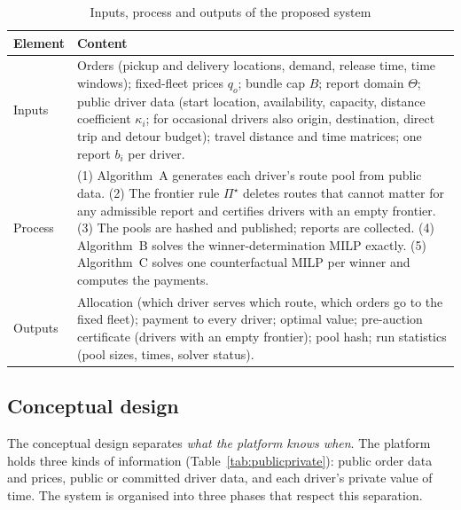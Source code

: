 \begin{table}[t]
\centering
\caption{Inputs, process and outputs of the proposed system}
\label{tab:ipo}
\small
\begin{tabular}{P{2.1cm}P{12.3cm}}
\toprule
Element & Content\\
\midrule
Inputs & Orders (pickup and delivery locations, demand, release time, time windows); fixed-fleet prices $q_o$; bundle cap $B$; report domain $\Theta$; public driver data (start location, availability, capacity, distance coefficient $\kappa_i$; for occasional drivers also origin, destination, direct trip and detour budget); travel distance and time matrices; one report $b_i$ per driver.\\
\addlinespace
Process & (1) Algorithm~A generates each driver's route pool from public data. (2) The frontier rule $\Pi^\star$ deletes routes that cannot matter for any admissible report and certifies drivers with an empty frontier. (3) The pools are hashed and published; reports are collected. (4) Algorithm~B solves the winner-determination MILP exactly. (5) Algorithm~C solves one counterfactual MILP per winner and computes the payments.\\
\addlinespace
Outputs & Allocation (which driver serves which route, which orders go to the fixed fleet); payment to every driver; optimal value; pre-auction certificate (drivers with an empty frontier); pool hash; run statistics (pool sizes, times, solver status).\\
\bottomrule
\end{tabular}
\end{table}

\subsection{Conceptual design}

The conceptual design separates \emph{what the platform knows when}. The
platform holds three kinds of information (Table~\ref{tab:publicprivate}):
public order data and prices, public or committed driver data, and each
driver's private value of time. The system is organised into three phases
that respect this separation.

